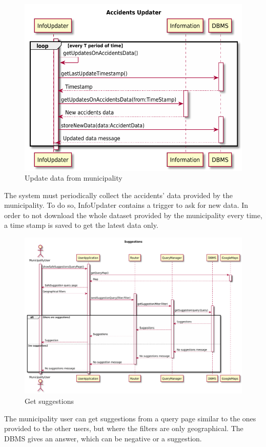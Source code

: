 \documentclass[./main.tex]{subfiles}
\begin{document}
\begin{figure}[H]
\centering
\includegraphics[width=\textwidth]{resources/sequence_diagrams/info_updater}
\caption{Update data from municipality}
\end{figure}

The system must periodically collect the accidents' data provided by the municipality. To do so, InfoUpdater contains a trigger to ask for new data. In order to not download the whole dataset provided by the municipality every time, a time stamp is saved to get the latest data only.


\begin{figure}[H]
\centering
\includegraphics[width=\textwidth]{resources/sequence_diagrams/suggestions}
\caption{Get suggestions}
\end{figure}


The municipality user can get suggestions from a query page similar to the ones provided to the other users, but where the filters are only geographical. The DBMS gives an answer, which can be negative or a suggestion.
\end{document}
